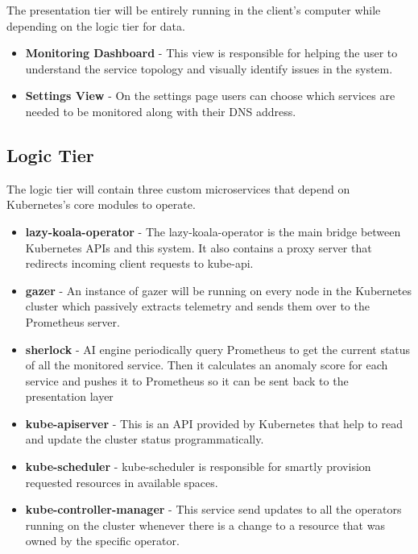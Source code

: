 The presentation tier will be entirely running in the client's computer while depending on the logic tier for data.

\begin{itemize}
    \item \textbf{Monitoring Dashboard} - This view is responsible for helping the user to understand the service topology and visually identify issues in the system.
    \item \textbf{Settings View} - On the settings page users can choose which services are needed to be monitored along with their DNS address.
\end{itemize}

\subsection{Logic Tier}

The logic tier will contain three custom microservices that depend on Kubernetes's core modules to operate.

\begin{itemize}
    \item \textbf{\ac{lazy-koala-operator}} - The \ac{lazy-koala-operator} is the main bridge between Kubernetes APIs and this system. It also contains a proxy server that redirects incoming client requests to kube-api.
    \item \textbf{\ac{gazer}} - An instance of \ac{gazer} will be running on every node in the Kubernetes cluster which passively extracts telemetry and sends them over to the Prometheus server.
    \item \textbf{\ac{sherlock}} - AI engine periodically query Prometheus to get the current status of all the monitored service. Then it calculates an anomaly score for each service and pushes it to Prometheus so it can be sent back to the presentation layer
    \item \textbf{kube-apiserver} - This is an API provided by Kubernetes that help to read and update the cluster status programmatically.
    \item \textbf{kube-scheduler} - kube-scheduler is responsible for smartly provision requested resources in available spaces.
    \item \textbf{kube-controller-manager} - This service send updates to all the operators running on the cluster whenever there is a change to a resource that was owned by the specific operator.
\end{itemize}


